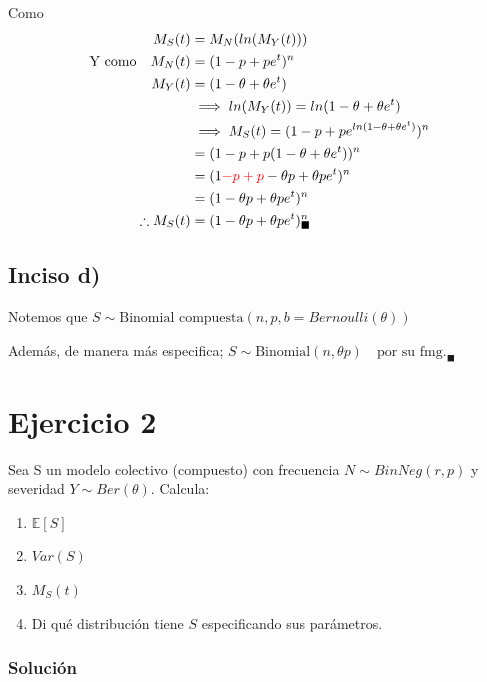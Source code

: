\documentclass[
]{article}
\begin{document}
Como \begin{align*}
M_{S}(t) &= M_{N} (ln(M_{Y}(t)))\\
\text{Y como} \quad M_{N}(t) &= (1-p + pe^{t})^{n}\\
              M_{Y}(t) &= (1 - \theta + \theta e^{t})\\
              &\implies ln(M_{Y}(t)) = ln(1 - \theta + \theta e^{t})\\
              &\implies M_{S}(t) = (1 - p + p e^{ln(1 - \theta + \theta e^{t})})^{n}\\
              &= (1 - p + p (1 - \theta + \theta e^{t}))^{n}\\
              &= (1 \textcolor{red}{- p + p} - \theta p + \theta p e^{t})^{n}\\
              &= (1 - \theta p + \theta p e^{t})^{n}\\
\therefore M_{S}(t) &= (1 - \theta p + \theta p e^{t})^{n}_\blacksquare
\end{align*}

\hypertarget{inciso-d}{%
\subsection{Inciso d)}\label{inciso-d}}

Notemos que
\(S \sim \text{Binomial compuesta} (n,p,b = Bernoulli(\theta))\)

Además, de manera más especifica;
\(S \sim \text{Binomial}(n, \theta p) \quad \text{por su fmg.}_\blacksquare\)

\hypertarget{ejercicio-2}{%
\section{Ejercicio 2}\label{ejercicio-2}}

Sea S un modelo colectivo (compuesto) con frecuencia
\(N\sim BinNeg(r,p)\) y severidad \(Y\sim Ber(\theta)\). Calcula:

\begin{enumerate}[label=(\alph*)]
\item  $\mathbb{E}[S]$
\item  $Var(S)$
\item  $M_S(t)$
\item Di qué distribución tiene $S$ especificando sus parámetros.
\end{enumerate}

\hypertarget{soluciuxf3n-1}{%
\subsubsection{Solución}\label{soluciuxf3n-1}}
\end{document}
